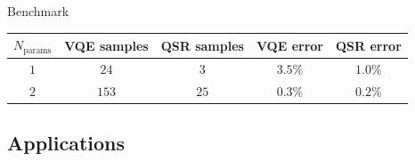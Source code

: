 \begin{frame}{Benchmark}
  \vspace{-1em}

  \begin{table}[!bp]
  	\centering
  	\begin{tabular}{ c c c c c }
  		\hline
  		\hline
  		$N_\text{params}$ & VQE samples & QSR samples &
  		VQE error & QSR error \\
  		\hline
  		$1$ & $24$ & $3$ & $3.5\%$ & $1.0\%$ \\
  		$2$ & $153$ & $25$ & $0.3\%$ & $0.2\%$ \\
  		\hline
  		\hline
  	\end{tabular}
  \end{table}

\end{frame}


\subsection{Applications}


